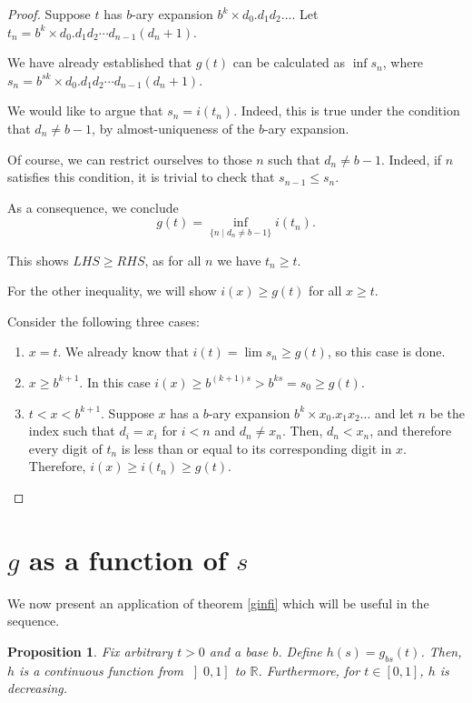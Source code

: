 \documentclass[11pt, reqno]{amsart}
\newcommand{\R}{\mathbb{R}}
\newtheorem{prop}{Proposition}
\begin{document}
\begin{proof}
Suppose $t$ has $b$-ary expansion $b^k \times d_0 . d_1 d_2 \dots$. Let $t_n = b^k \times d_0 . d_1 d_2 \cdots d_{n-1} (d_n + 1)$.

We have already established that $g(t)$ can be calculated as $\inf s_n$, where $s_n = b^{sk} \times d_0 . d_1 d_2 \cdots d_{n-1} (d_n + 1)$.

We would like to argue that $s_n = i(t_n)$. Indeed, this is true under the condition that $d_n \neq b-1$, by almost-uniqueness of the $b$-ary expansion.

Of course, we can restrict ourselves to those $n$ such that $d_n \neq b-1$. Indeed, if $n$ satisfies this condition, it is trivial to check that $s_{n-1} \leq s_n$.

As a consequence, we conclude
\[g(t) = \inf_{\{n \mid d_n \neq b-1\}} i(t_n).\]

This shows $LHS \geq RHS$, as for all $n$ we have $t_n \geq t$.

For the other inequality, we will show $i(x) \geq g(t)$ for all $x \geq t$.

Consider the following three cases:


\begin{enumerate}[label=\textbf{Case \arabic*:}]

\item $x = t$. We already know that $i(t) = \lim s_n \geq g(t)$, so this case is done.

\item $x \geq b^{k+1}$. In this case $i(x) \geq b^{(k+1)s} > b^{ks} = s_0 \geq g(t)$.

\item $t < x < b^{k+1}$. Suppose $x$ has a $b$-ary expansion $b^k \times x_0 . x_1 x_2 \dots$ and let $n$ be the index such that $d_i = x_i$ for $i < n$ and $d_n \neq x_n$. Then, $d_n < x_n$, and therefore every digit of $t_n$ is less than or equal to its corresponding digit in $x$. Therefore, $i(x) \geq i(t_n) \geq g(t)$.
\end{enumerate}
\end{proof}

\section{$g$ as a function of $s$}

We now present an application of theorem \ref{ginfi} which will be useful in the sequence.

\begin{prop} \label{gfuncofs}
Fix arbitrary $t > 0$ and a base $b$. Define $h(s) = g_{bs}(t)$. Then, $h$ is a continuous function from $\left]0, 1 \right]$ to $\R$. Furthermore, for $t \in \left[0, 1 \right]$, $h$ is decreasing.
\end{prop}
\end{document}
